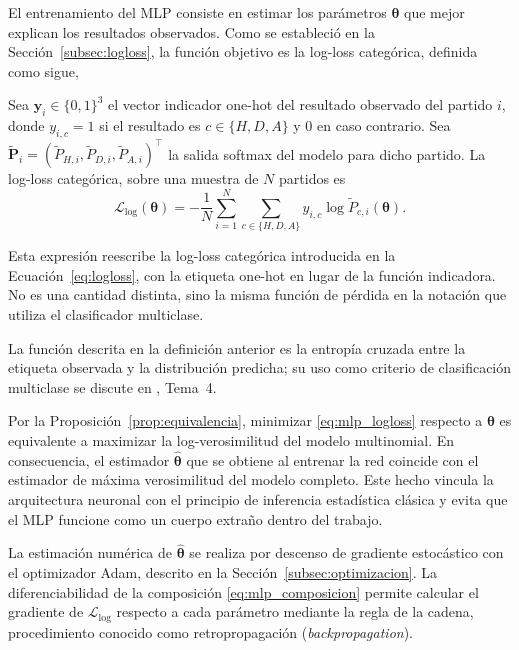 El entrenamiento del MLP consiste en estimar los par\'ametros $\boldsymbol{\theta}$ que mejor explican los resultados observados. Como se estableci\'o en la Secci\'on~\ref{subsec:logloss}, la funci\'on objetivo es la log-loss categ\'orica, definida como sigue,
\begin{definition}
	Sea $\mathbf{y}_i \in \{0,1\}^3$ el vector indicador one-hot del resultado observado del partido $i$, donde $y_{i,c} = 1$ si el resultado es $c \in \{H,D,A\}$ y $0$ en caso contrario. Sea $\tilde{\mathbf{P}}_i = (\tilde{P}_{H,i}, \tilde{P}_{D,i}, \tilde{P}_{A,i})^\top$ la salida softmax del modelo para dicho partido. La log-loss categ\'orica, sobre una muestra de $N$ partidos es
	\begin{equation}\label{eq:mlp_logloss}
		\mathcal{L}_{\mathrm{log}}(\boldsymbol{\theta}) = -\frac{1}{N}\sum_{i=1}^{N} \sum_{c\in\{H,D,A\}} y_{i,c} \log \tilde{P}_{c,i}(\boldsymbol{\theta}).
	\end{equation}
\end{definition}

\begin{obs}
	Esta expresi\'on reescribe la log-loss categ\'orica introducida en la Ecuaci\'on~\eqref{eq:logloss}, con la etiqueta one-hot en lugar de la funci\'on indicadora. No es una cantidad distinta, sino la misma funci\'on de p\'erdida en la notaci\'on que utiliza el clasificador multiclase.
\end{obs}

La funci\'on descrita en la definici\'on anterior es la entrop\'ia cruzada entre la etiqueta observada y la distribuci\'on predicha; su uso como criterio de clasificaci\'on multiclase se discute en \cite{hernandezBenito}, Tema~4.

Por la Proposici\'on~\ref{prop:equivalencia}, minimizar \eqref{eq:mlp_logloss} respecto a $\boldsymbol{\theta}$ es equivalente a maximizar la log-verosimilitud del modelo multinomial. En consecuencia, el estimador $\hat{\boldsymbol{\theta}}$ que se obtiene al entrenar la red coincide con el estimador de m\'axima verosimilitud del modelo completo. Este hecho vincula la arquitectura neuronal con el principio de inferencia estad\'istica cl\'asica y evita que el MLP funcione como un cuerpo extra\~no dentro del trabajo.

La estimaci\'on num\'erica de $\hat{\boldsymbol{\theta}}$ se realiza por descenso de gradiente estoc\'astico con el optimizador Adam, descrito en la Secci\'on~\ref{subsec:optimizacion}. La diferenciabilidad de la composici\'on \eqref{eq:mlp_composicion} permite calcular el gradiente de $\mathcal{L}_{\mathrm{log}}$ respecto a cada par\'ametro mediante la regla de la cadena, procedimiento conocido como retropropagaci\'on (\emph{backpropagation}).

